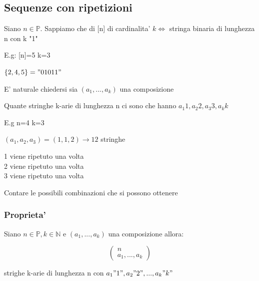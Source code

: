 \documentclass{article}
\begin{document}
        \subsection{Sequenze con ripetizioni}
        \begin{flushleft}
          Siano $n \in \mathbb{P}$. Sappiamo che di [n] di cardinalita' $k \iff$ stringa binaria di lunghezza n con k "1" 
        \end{flushleft}
          E.g: [n]=5 k=3
        \begin{flushleft}
          $\{2,4,5\}="01011"$
        \end{flushleft}
        \begin{flushleft}
          E' naturale chiedersi sia $(a_1,...,a_k)$ una composizione
        \end{flushleft}
        \begin{flushleft}
          Quante stringhe k-arie di lunghezza n ci sono che hanno $a_1 1,a_2 2, a_3 3,a_k k$
        \end{flushleft}
        E.g n=4 k=3
        \begin{flushleft}
          $(a_1,a_2,a_3)=(1,1,2)\to 12$ stringhe
        \end{flushleft}
        \begin{flushleft}
          1 viene ripetuto una volta \\
          2 viene ripetuto una volta \\ 
          3 viene ripetuto una volta  \\
        \end{flushleft}
        \begin{flushleft}
          Contare le possibili combinazioni che si possono ottenere
        \end{flushleft}
        \subsubsection{Proprieta'}
        \begin{flushleft}
          Siano $n \in \mathbb{P}, k \in \mathbb{N}$ e $(a_1,...,a_k)$ una composizione allora:
        \end{flushleft}
        \begin{equation}
          \begin{pmatrix}
            n \\ 
            a_1,...,a_k
          \end{pmatrix}
        \end{equation}
        \begin{flushleft}
          strighe k-arie di lunghezza n con $a_1 "1",a_2 "2",...,a_k "k"$
        \end{flushleft}
        
\end{document}

